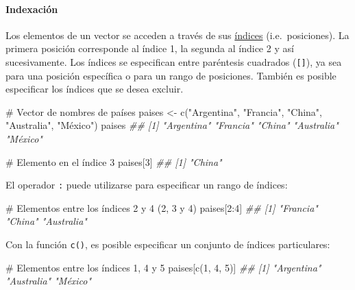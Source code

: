 \documentclass[
  letterpaper,
  DIV=11,
  numbers=noendperiod]{scrreprt}
\let\oldparagraph\paragraph
\renewcommand{\paragraph}[1]{\oldparagraph{#1}\mbox{}}
\newenvironment{Shaded}{\begin{snugshade}}{\end{snugshade}}
\newcommand{\CommentTok}[1]{\textcolor[rgb]{0.37,0.37,0.37}{#1}}
\newcommand{\DecValTok}[1]{\textcolor[rgb]{0.68,0.00,0.00}{#1}}
\newcommand{\DocumentationTok}[1]{\textcolor[rgb]{0.37,0.37,0.37}{\textit{#1}}}
\newcommand{\FunctionTok}[1]{\textcolor[rgb]{0.28,0.35,0.67}{#1}}
\newcommand{\NormalTok}[1]{\textcolor[rgb]{0.00,0.23,0.31}{#1}}
\newcommand{\OtherTok}[1]{\textcolor[rgb]{0.00,0.23,0.31}{#1}}
\newcommand{\SpecialCharTok}[1]{\textcolor[rgb]{0.37,0.37,0.37}{#1}}
\newcommand{\StringTok}[1]{\textcolor[rgb]{0.13,0.47,0.30}{#1}}
\begin{document}
\hypertarget{indexaciuxf3n}{%
\paragraph{Indexación}\label{indexaciuxf3n}}

Los elementos de un vector se acceden a través de sus
\href{https://cran.r-project.org/doc/manuals/r-release/R-lang.html\#Indexing}{índices}
(i.e.~posiciones). La primera posición corresponde al índice 1, la
segunda al índice 2 y así sucesivamente. Los índices se especifican
entre paréntesis cuadrados (\texttt{{[}{]}}), ya sea para una posición
específica o para un rango de posiciones. También es posible especificar
los índices que se desea excluir.

\begin{Shaded}
\begin{Highlighting}[]
\CommentTok{\# Vector de nombres de países}
\NormalTok{paises }\OtherTok{\textless{}{-}} \FunctionTok{c}\NormalTok{(}\StringTok{"Argentina"}\NormalTok{, }\StringTok{"Francia"}\NormalTok{, }\StringTok{"China"}\NormalTok{, }\StringTok{"Australia"}\NormalTok{, }\StringTok{"México"}\NormalTok{)}
\NormalTok{paises}
\DocumentationTok{\#\# [1] "Argentina" "Francia"   "China"     "Australia" "México"}

\CommentTok{\# Elemento en el índice 3}
\NormalTok{paises[}\DecValTok{3}\NormalTok{]}
\DocumentationTok{\#\# [1] "China"}
\end{Highlighting}
\end{Shaded}

El operador \texttt{:} puede utilizarse para especificar un rango de
índices:

\begin{Shaded}
\begin{Highlighting}[]
\CommentTok{\# Elementos entre los índices 2 y 4 (2, 3 y 4)}
\NormalTok{paises[}\DecValTok{2}\SpecialCharTok{:}\DecValTok{4}\NormalTok{]}
\DocumentationTok{\#\# [1] "Francia"   "China"     "Australia"}
\end{Highlighting}
\end{Shaded}

Con la función \texttt{c()}, es posible especificar un conjunto de
índices particulares:

\begin{Shaded}
\begin{Highlighting}[]
\CommentTok{\# Elementos entre los índices 1, 4 y 5}
\NormalTok{paises[}\FunctionTok{c}\NormalTok{(}\DecValTok{1}\NormalTok{, }\DecValTok{4}\NormalTok{, }\DecValTok{5}\NormalTok{)]}
\DocumentationTok{\#\# [1] "Argentina" "Australia" "México"}
\end{Highlighting}
\end{Shaded}
\end{document}
